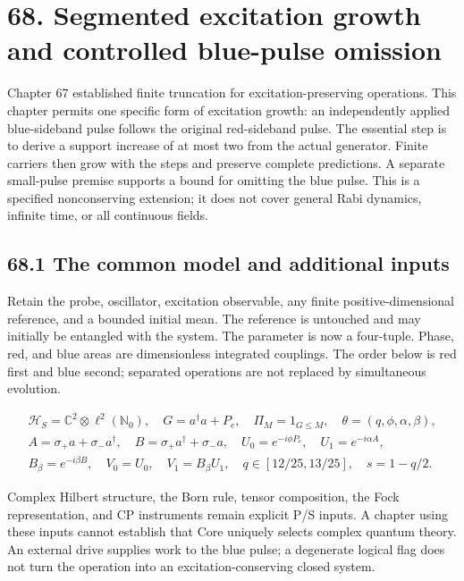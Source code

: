 \documentclass[
  11pt,
  oneside]{book}
\begin{document}
\chapter{68. Segmented excitation growth and controlled blue-pulse
omission}\label{ch-68}

Chapter 67 established finite truncation for excitation-preserving
operations. This chapter permits one specific form of excitation growth:
an independently applied blue-sideband pulse follows the original
red-sideband pulse. The essential step is to derive a support increase
of at most two from the actual generator. Finite carriers then grow with
the steps and preserve complete predictions. A separate small-pulse
premise supports a bound for omitting the blue pulse. This is a
specified nonconserving extension; it does not cover general Rabi
dynamics, infinite time, or all continuous fields.

\section{68.1 The common model and additional inputs}

Retain the probe, oscillator, excitation observable, any finite
positive-dimensional reference, and a bounded initial mean. The
reference is untouched and may initially be entangled with the system.
The parameter is now a four-tuple. Phase, red, and blue areas are
dimensionless integrated couplings. The order below is red first and
blue second; separated operations are not replaced by simultaneous
evolution.

\[
\begin{gathered}
\mathcal H_S=\mathbb C^2\otimes\ell^2(\mathbb N_0),\quad
G=a^\dagger a+P_e,\quad \Pi_M=1_{G\le M},\quad
\theta=(q,\phi,\alpha,\beta),\\
A=\sigma_+a+\sigma_-a^\dagger,\quad
B=\sigma_+a^\dagger+\sigma_-a,\quad
U_0=e^{-i\phi P_e},\quad U_1=e^{-i\alpha A},\\
B_\beta=e^{-i\beta B},\quad V_0=U_0,\quad V_1=B_\beta U_1,\quad
q\in[12/25,13/25],\quad s=1-q/2.
\end{gathered}
\]

Complex Hilbert structure, the Born rule, tensor composition, the Fock
representation, and CP instruments remain explicit P/S inputs. A chapter
using these inputs cannot establish that Core uniquely selects complex
quantum theory. An external drive supplies work to the blue pulse; a
degenerate logical flag does not turn the operation into an
excitation-conserving closed system.
\end{document}
